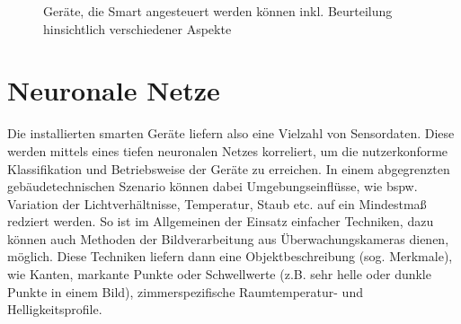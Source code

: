 \begin{figure}[htbp]
    \centering
    \caption{\label{fig-smart-devices}Geräte, die Smart angesteuert werden können inkl. Beurteilung hinsichtlich verschiedener Aspekte}
\end{figure}

\newpage
\section{Neuronale Netze}
Die installierten smarten Geräte liefern also eine Vielzahl von Sensordaten. Diese werden mittels eines tiefen neuronalen Netzes korreliert, um die nutzerkonforme Klassifikation und Betriebsweise der Geräte zu erreichen. In einem abgegrenzten gebäudetechnischen Szenario können dabei Umgebungseinflüsse, wie bspw. Variation der Lichtverhältnisse, Temperatur, Staub etc. auf ein Mindestmaß redziert werden. So ist im Allgemeinen der Einsatz einfacher Techniken, dazu können auch Methoden der Bildverarbeitung aus Überwachungskameras dienen, möglich. Diese Techniken liefern dann eine Objektbeschreibung (sog. Merkmale), wie Kanten, markante Punkte oder Schwellwerte (z.B. sehr helle oder dunkle Punkte in einem Bild), zimmerspezifische Raumtemperatur- und Helligkeitsprofile.

